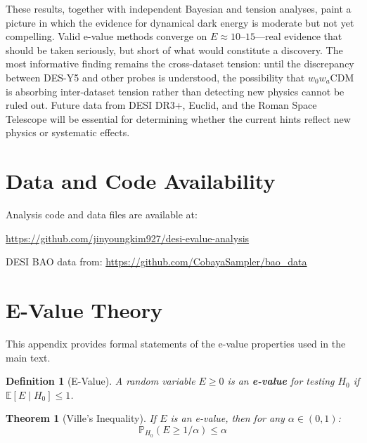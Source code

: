 \documentclass[11pt,a4paper]{article}
\newtheorem{definition}{Definition}
\newtheorem{theorem}{Theorem}
\newcommand{\E}{\mathbb{E}}
\newcommand{\Prob}{\mathbb{P}}
\begin{document}
These results, together with independent Bayesian \citep{OngBayesian2025} and tension \citep{WangMota2025} analyses, paint a picture in which the evidence for dynamical dark energy is moderate but not yet compelling. Valid e-value methods converge on $E \approx 10$--$15$---real evidence that should be taken seriously, but short of what would constitute a discovery. The most informative finding remains the cross-dataset tension: until the discrepancy between DES-Y5 and other probes is understood, the possibility that $w_0w_a$CDM is absorbing inter-dataset tension rather than detecting new physics cannot be ruled out. Future data from DESI DR3+, Euclid, and the Roman Space Telescope will be essential for determining whether the current hints reflect new physics or systematic effects.

\section*{Data and Code Availability}

Analysis code and data files are available at:
\begin{center}
\url{https://github.com/jinyoungkim927/desi-evalue-analysis}
\end{center}

DESI BAO data from: \url{https://github.com/CobayaSampler/bao_data}

\appendix
\section{E-Value Theory}
\label{app:proofs}

This appendix provides formal statements of the e-value properties used in the main text.

\begin{definition}[E-Value]
A random variable $E \geq 0$ is an \textbf{e-value} for testing $H_0$ if $\E[E \mid H_0] \leq 1$.
\end{definition}

\begin{theorem}[Ville's Inequality]
\label{thm:ville}
If $E$ is an e-value, then for any $\alpha \in (0,1)$:
\begin{equation}
\Prob_{H_0}(E \geq 1/\alpha) \leq \alpha
\end{equation}
\end{theorem}
\end{document}
